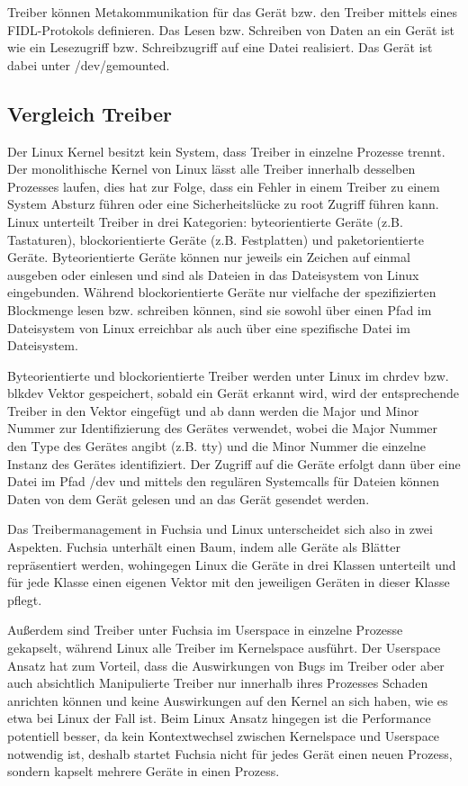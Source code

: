 \documentclass[a4paper]{scrartcl}
\begin{document}
Treiber können Metakommunikation für das Gerät bzw. den Treiber mittels eines FIDL-Protokols definieren. Das Lesen bzw. Schreiben von Daten an ein Gerät ist wie ein Lesezugriff bzw. Schreibzugriff auf eine Datei realisiert. Das Gerät ist dabei unter /dev/gemounted.
\subsection{Vergleich Treiber}
Der Linux Kernel besitzt kein System, dass Treiber in einzelne Prozesse trennt. Der monolithische Kernel von Linux lässt alle Treiber innerhalb desselben Prozesses laufen, dies hat zur Folge, dass ein Fehler in einem Treiber zu einem System Absturz führen oder eine Sicherheitslücke zu root Zugriff führen kann. Linux unterteilt Treiber in drei Kategorien: byteorientierte Geräte (z.B. Tastaturen), blockorientierte Geräte (z.B. Festplatten) und paketorientierte Geräte. Byteorientierte Geräte können nur jeweils ein Zeichen auf einmal ausgeben oder einlesen und sind als Dateien in das Dateisystem von Linux eingebunden. Während blockorientierte Geräte nur vielfache der spezifizierten Blockmenge lesen bzw. schreiben können, sind sie sowohl über einen Pfad im Dateisystem von Linux erreichbar als auch über eine spezifische Datei im Dateisystem. 

Byteorientierte und blockorientierte Treiber werden unter Linux im chrdev bzw. blkdev Vektor gespeichert, sobald ein Gerät erkannt wird, wird der entsprechende Treiber in den Vektor eingefügt und ab dann werden die Major und Minor Nummer zur Identifizierung des Gerätes verwendet, wobei die Major Nummer den Type des Gerätes angibt (z.B. tty) und die Minor Nummer die einzelne Instanz des Gerätes identifiziert. Der Zugriff auf die Geräte erfolgt dann über eine Datei im Pfad /dev und mittels den regulären Systemcalls für Dateien können Daten von dem Gerät gelesen und an das Gerät gesendet werden.

Das Treibermanagement in Fuchsia und Linux unterscheidet sich also in zwei Aspekten. Fuchsia unterhält einen Baum, indem alle Geräte als Blätter repräsentiert werden, wohingegen Linux die Geräte in drei Klassen unterteilt und für jede Klasse einen eigenen Vektor mit den jeweiligen Geräten in dieser Klasse pflegt.

Außerdem sind Treiber unter Fuchsia im Userspace in einzelne Prozesse gekapselt, während Linux alle Treiber im Kernelspace ausführt. Der Userspace Ansatz hat zum Vorteil, dass die Auswirkungen von Bugs im Treiber oder aber auch absichtlich Manipulierte Treiber nur innerhalb ihres Prozesses Schaden anrichten können und keine Auswirkungen auf den Kernel an sich haben, wie es etwa bei Linux der Fall ist. Beim Linux Ansatz hingegen ist die Performance potentiell besser, da kein Kontextwechsel zwischen Kernelspace und Userspace notwendig ist, deshalb startet Fuchsia nicht für jedes Gerät einen neuen Prozess, sondern kapselt mehrere Geräte in einen Prozess.
\end{document}
